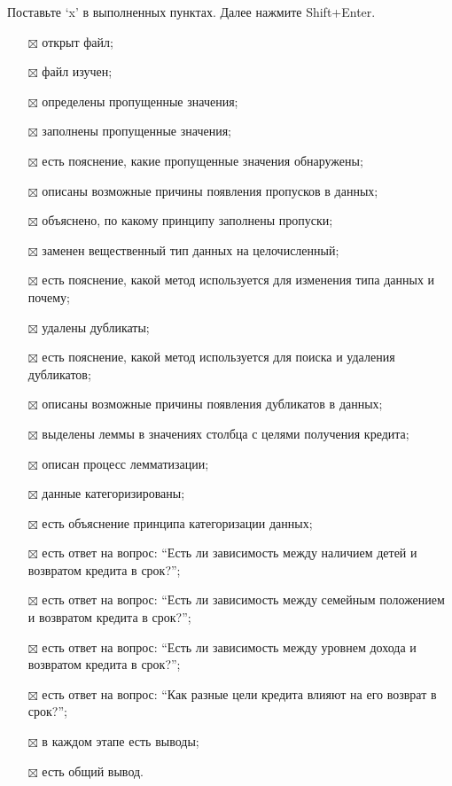 \documentclass[11pt]{article}
\providecommand{\tightlist}{%
      \setlength{\itemsep}{0pt}\setlength{\parskip}{0pt}}
\begin{document}
Поставьте `x' в выполненных пунктах. Далее нажмите Shift+Enter.

    \begin{itemize}
\tightlist
\item[$\boxtimes$]
  открыт файл;
\item[$\boxtimes$]
  файл изучен;
\item[$\boxtimes$]
  определены пропущенные значения;
\item[$\boxtimes$]
  заполнены пропущенные значения;
\item[$\boxtimes$]
  есть пояснение, какие пропущенные значения обнаружены;
\item[$\boxtimes$]
  описаны возможные причины появления пропусков в данных;
\item[$\boxtimes$]
  объяснено, по какому принципу заполнены пропуски;
\item[$\boxtimes$]
  заменен вещественный тип данных на целочисленный;
\item[$\boxtimes$]
  есть пояснение, какой метод используется для изменения типа данных и
  почему;
\item[$\boxtimes$]
  удалены дубликаты;
\item[$\boxtimes$]
  есть пояснение, какой метод используется для поиска и удаления
  дубликатов;
\item[$\boxtimes$]
  описаны возможные причины появления дубликатов в данных;
\item[$\boxtimes$]
  выделены леммы в значениях столбца с целями получения кредита;
\item[$\boxtimes$]
  описан процесс лемматизации;
\item[$\boxtimes$]
  данные категоризированы;
\item[$\boxtimes$]
  есть объяснение принципа категоризации данных;
\item[$\boxtimes$]
  есть ответ на вопрос: ``Есть ли зависимость между наличием детей и
  возвратом кредита в срок?'';
\item[$\boxtimes$]
  есть ответ на вопрос: ``Есть ли зависимость между семейным положением
  и возвратом кредита в срок?'';
\item[$\boxtimes$]
  есть ответ на вопрос: ``Есть ли зависимость между уровнем дохода и
  возвратом кредита в срок?'';
\item[$\boxtimes$]
  есть ответ на вопрос: ``Как разные цели кредита влияют на его возврат
  в срок?'';
\item[$\boxtimes$]
  в каждом этапе есть выводы;
\item[$\boxtimes$]
  есть общий вывод.
\end{itemize}


    
    
    
    
\end{document}
